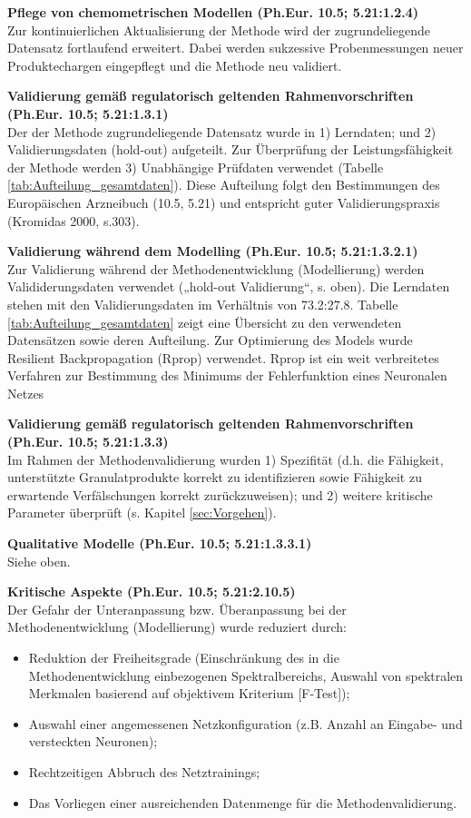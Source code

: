 \documentclass[11pt, a4paper]{article}
\newcommand\VersionPhEur{10.5}
\newcommand\VerhaeltnisLernValDaten{73.2:27.8}
\begin{document}
\textbf{Pflege von chemometrischen Modellen (Ph.Eur. \VersionPhEur; 5.21:1.2.4)}\\[1.2pt]
Zur kontinuierlichen Aktualisierung der Methode wird der zugrundeliegende Datensatz fortlaufend erweitert. Dabei werden sukzessive Probenmessungen neuer Produktechargen eingepflegt und die Methode neu validiert.

\textbf{Validierung gemäß regulatorisch geltenden Rahmenvorschriften (Ph.Eur. \VersionPhEur; 5.21:1.3.1)}\\[1.2pt]
Der der Methode zugrundeliegende Datensatz wurde in 1) Lerndaten; und 2) Validierungsdaten (hold-out) aufgeteilt. Zur Überprüfung der Leistungsfähigkeit der Methode werden 3) Unabhängige Prüfdaten verwendet (Tabelle \ref{tab:Aufteilung_gesamtdaten}). Diese Aufteilung folgt den Bestimmungen des Europäischen Arzneibuch (\VersionPhEur, 5.21) und entspricht guter Validierungspraxis (Kromidas 2000, s.303).

\textbf{Validierung während dem Modelling (Ph.Eur. \VersionPhEur; 5.21:1.3.2.1)}\\[1.2pt]
Zur Validierung während der Methodenentwicklung (Modellierung) werden Valididerungsdaten verwendet („hold-out Validierung“, s. oben). Die Lerndaten stehen mit den Validierungsdaten im Verhältnis von \VerhaeltnisLernValDaten. Tabelle \ref{tab:Aufteilung_gesamtdaten} zeigt eine Übersicht zu den verwendeten Datensätzen sowie deren Aufteilung. Zur Optimierung des Models wurde Resilient Backpropagation (Rprop) verwendet. Rprop ist ein weit verbreitetes Verfahren zur Bestimmung des Minimums der Fehlerfunktion eines Neuronalen Netzes

\textbf{Validierung gemäß regulatorisch geltenden Rahmenvorschriften (Ph.Eur. \VersionPhEur; 5.21:1.3.3)}\\[1.2pt]
Im Rahmen der Methodenvalidierung wurden 1) Spezifität (d.h. die Fähigkeit, unterstützte Granulatprodukte korrekt zu identifizieren sowie Fähigkeit zu erwartende Verfälschungen korrekt zurückzuweisen); und 2) weitere kritische Parameter überprüft (s. Kapitel \ref{sec:Vorgehen}).

\textbf{Qualitative Modelle (Ph.Eur. \VersionPhEur; 5.21:1.3.3.1)}\\[1.2pt]
Siehe oben.

\textbf{Kritische Aspekte (Ph.Eur. \VersionPhEur; 5.21:2.10.5)}\\[1.2pt]
Der Gefahr der Unteranpassung bzw. Überanpassung bei der Methodenentwicklung (Modellierung) wurde reduziert durch:
\begin{itemize}
\item Reduktion der Freiheitsgrade (Einschränkung des in die Methodenentwicklung einbezogenen Spektralbereichs, Auswahl von spektralen Merkmalen basierend auf objektivem Kriterium [F-Test]);
\item Auswahl einer angemessenen Netzkonfiguration (z.B. Anzahl an Eingabe- und versteckten Neuronen);
\item Rechtzeitigen Abbruch des Netztrainings;
\item Das Vorliegen einer ausreichenden Datenmenge für die Methodenvalidierung.
\end{itemize}
\end{document}
